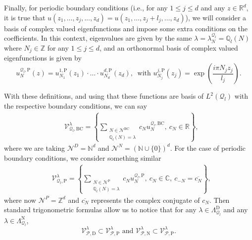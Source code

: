 \documentclass{amsart}
\theoremstyle{definition}
\theoremstyle{remark}
\renewcommand\leq\leqslant
\numberwithin{equation}{section}
\theoremstyle{definition}
\theoremstyle{remark}
\begin{document}
Finally, for periodic boundary conditions (i.e., for any $1\leq j\leq d$ and any $z\in\mathbb{R}^d$, it is true that $u\left(z_1,\ldots,z_j,\ldots,z_d\right)=u\left(z_1,\ldots,z_j+l_j,\ldots,z_d\right)$), we will consider a basis of complex valued eigenfunctions and impose some extra conditions on the coefficients. In this context, eigenvalues are given by the same $\lambda=\lambda_N^{\mathcal{Q}_l}=\mathbb{Q}_l(N)$ where $N_j\in\mathbb{Z}$ for any $1\leq j\leq d$, and an orthonormal basis of complex valued  eigenfunctions is given by\begin{equation}
	u_{N}^{\mathcal{Q}_l,\mathrm{P}}(z)=u_{N_1}^{1,\mathrm{P}}(z_1)\cdot\ldots\cdot u_{N_d}^{d,\mathrm{P}}(z_d),\ \text{ with }u_{N_j}^{j,\mathrm{P}}(z_j)=\exp\left(\frac{i\pi N_j z_j}{l_j}\right).
\end{equation}

With these definitions, and using that these functions are basis of $L^2\left(\mathcal{Q}_l\right)$ with the respective boundary conditions, we can say
\begin{equation}
	\begin{aligned}
		&\mathcal{V}_{\mathcal{Q}_l,\mathrm{BC}}^\lambda=\left\{	\sum_{\substack{N\in\mathcal{N}^{\mathrm{BC}}\\ \mathbb{Q}_l(N)=\lambda}}c_Nu_{N}^{\mathcal{Q}_l,\mathrm{BC}},\ 	 c_N\in\mathbb{R}\right\},
	\end{aligned}
\end{equation} where we are taking $\mathcal{N}^D=\mathbb{N}^d$ and $\mathcal{N}^N=\left(\mathbb{N}\cup\{0\}\right)^d$. For the case of periodic boundary conditions, we consider something similar\begin{equation}
	\begin{aligned}
		&\mathcal{V}_{\mathcal{Q}_l,\mathrm{P}}^\lambda=\left\{	\sum_{\substack{N\in\mathcal{N}^{\mathrm{P}}\\ \mathbb{Q}_l(N)=\lambda}}c_Nu_{N}^{\mathcal{Q}_l,\mathrm{P}},\ 	 c_N\in\mathbb{C},\ c_{-N}=\overline{c_N}\right\},
	\end{aligned}
\end{equation} where now $\mathcal{N}^P=\mathbb{Z}^d$ and $\overline{c_N}$ represents the complex conjugate of $c_N$. Then standard trigonometric formulas allow us to notice that for any $\lambda\in\Lambda_{\mathcal{Q}_l}^{\mathrm{D}}$ and any $\lambda\in\Lambda_{\mathcal{Q}_l}^{\mathrm{N}}$, \begin{equation}\label{torus}
\mathcal{V}_{\mathcal{P},\mathrm{D}}^\lambda\subset\mathcal{V}_{\mathcal{P},\mathrm{P}}^\lambda \text{ and }\mathcal{V}_{\mathcal{P},\mathrm{N}}^\lambda\subset\mathcal{V}_{\mathcal{P},\mathrm{P}}^\lambda.
\end{equation}
\end{document}
